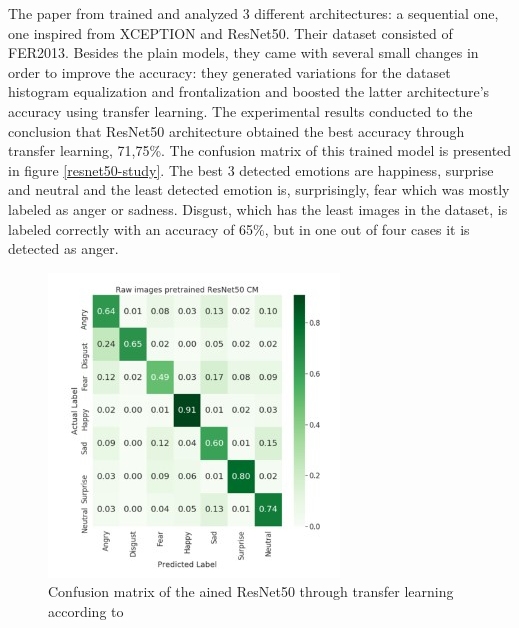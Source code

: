 \documentclass[runningheads,a4paper,12pt]{report}
\begin{document}
The paper from \cite{cnn-architectures-for-fer} trained and analyzed 3 different architectures: a sequential one, one inspired from XCEPTION and ResNet50. Their dataset consisted of FER2013. Besides the plain models, they came with several small changes in order to improve the accuracy: they generated variations for the dataset histogram equalization and frontalization and boosted the latter architecture's accuracy using transfer learning. The experimental results conducted to the conclusion that ResNet50 architecture obtained the best accuracy through transfer learning, 71,75\%. The confusion matrix of this trained model is presented in figure \ref{resnet50-study}. The best 3 detected emotions are happiness, surprise and neutral and the least detected emotion is, surprisingly, fear which was mostly labeled as anger or sadness. Disgust, which has the least images in the dataset, is labeled correctly with an accuracy of 65\%, but in one out of four cases it is detected as anger. 

\begin{figure}
	\centering

  	\includegraphics[width=\linewidth]{./images/2_resnet50}\hfill

    \caption{Confusion matrix of the ained ResNet50 through transfer learning according to \cite{cnn-architectures-for-fer}}  
    \label{fig:resnet50-study}
\end{figure}
\end{document}
